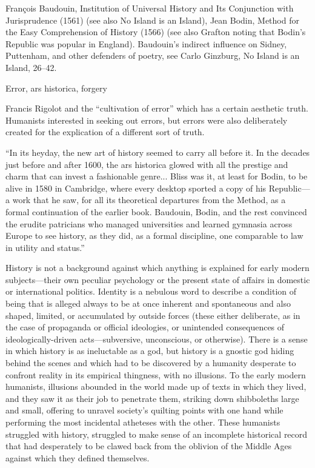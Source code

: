 François Baudouin, Institution of Universal History and Its Conjunction with Jurisprudence (1561) (see also No Island is an Island), Jean Bodin, Method for the Easy Comprehension of History (1566) (see also Grafton noting that Bodin's Republic was popular in England). Baudouin's indirect influence on Sidney, Puttenham, and other defenders of poetry, see Carlo Ginzburg, No Island is an Island, 26--42. \nocite{ginzburg_no_2000}

Error, ars historica, forgery

Francis Rigolot and the ``cultivation of error'' which has a certain aesthetic truth. Humanists interested in seeking out errors, but errors were also deliberately created for the explication of a different sort of truth.~\cite[1219--1234]{rigolot_renaissance_2004}

``In its heyday, the new art of history seemed to carry all before it. In the decades just before and after 1600, the ars historica glowed with all the prestige and charm that can invest a fashionable genre... Bliss was it, at least for Bodin, to be alive in 1580 in Cambridge, where every desktop sported a copy of his Republic---a work that he saw, for all its theoretical departures from the Method, as a formal continuation of the earlier book. Baudouin, Bodin, and the rest convinced the erudite patricians who managed universities and learned gymnasia across Europe to see history, as they did, as a formal discipline, one comparable to law in utility and status.''~\cite[192--193]{grafton_what_2007}

History is not a background against which anything is explained for early modern subjects---their own peculiar psychology or the present state of affairs in domestic or international politics. Identity is a nebulous word to describe a condition of being that is alleged always to be at once inherent and spontaneous and also shaped, limited, or accumulated by outside forces (these either deliberate, as in the case of propaganda or official ideologies, or unintended consequences of ideologically-driven acts---subversive, unconscious, or otherwise). There is a sense in which history is as ineluctable as a god, but history is a gnostic god hiding behind the scenes and which had to be discovered by a humanity desperate to confront reality in its empirical thingness, with no illusions. To the early modern humanists, illusions abounded in the world made up of texts in which they lived, and they saw it as their job to penetrate them, striking down shibboleths large and small, offering to unravel society's quilting points with one hand while performing the most incidental atheteses with the other. These humanists struggled with history, struggled to make sense of an incomplete historical record that had desperately to be clawed back from the oblivion of the Middle Ages against which they defined themselves.


